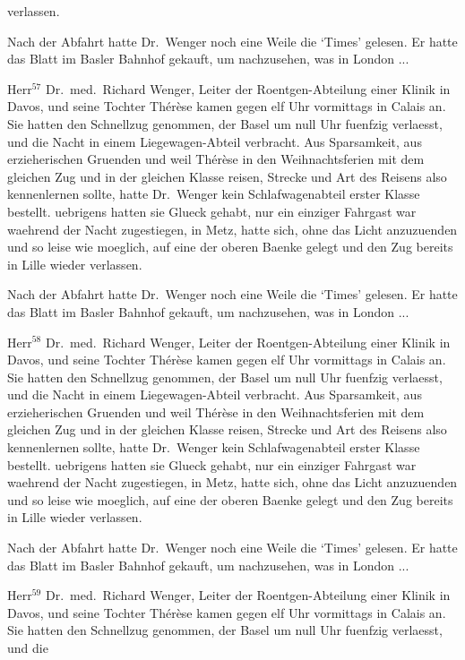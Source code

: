 verlassen.\par
Nach der Abfahrt hatte Dr.~Wen\-ger noch eine
Weile die `Times' gelesen. Er hatte das Blatt im
Basler Bahnhof gekauft, um nachzusehen, was in London ...\par
Herr$^{57}$ Dr.~med.~Richard Wenger, Leiter der Roent\-gen-Ab\-tei\-lung
einer Klinik in Davos, und seine
Tochter Th\'e\-r\`ese kamen gegen elf Uhr vormittags
in Calais an. Sie hatten den Schnellzug genommen,
der Basel um null Uhr fuenfzig verlaesst, und die
Nacht in einem Liege\-wagen-Abteil verbracht.
Aus Sparsamkeit, aus erzieherischen
Gruenden und weil
Th\'e\-r\`ese in den Weihnachtsferien mit dem gleichen
Zug und in der gleichen Klasse reisen, Strecke und
Art des Reisens also kennenlernen sollte, hatte Dr.~Wenger
kein Schlafwagenabteil erster Klasse bestellt.
uebrigens hatten sie Glueck gehabt, nur ein
einziger Fahrgast war waehrend der Nacht zugestiegen,
in Metz, hatte sich, ohne das Licht anzuzuenden
und so leise wie moeglich, auf eine der oberen
Baenke gelegt und den Zug bereits in Lille wieder
verlassen.\par
Nach der Abfahrt hatte Dr.~Wen\-ger noch eine
Weile die `Times' gelesen. Er hatte das Blatt im
Basler Bahnhof gekauft, um nachzusehen, was in London ...\par
Herr$^{58}$ Dr.~med.~Richard Wenger, Leiter der Roent\-gen-Ab\-tei\-lung
einer Klinik in Davos, und seine
Tochter Th\'e\-r\`ese kamen gegen elf Uhr vormittags
in Calais an. Sie hatten den Schnellzug genommen,
der Basel um null Uhr fuenfzig verlaesst, und die
Nacht in einem Liege\-wagen-Abteil verbracht.
Aus Sparsamkeit, aus erzieherischen
Gruenden und weil
Th\'e\-r\`ese in den Weihnachtsferien mit dem gleichen
Zug und in der gleichen Klasse reisen, Strecke und
Art des Reisens also kennenlernen sollte, hatte Dr.~Wenger
kein Schlafwagenabteil erster Klasse bestellt.
uebrigens hatten sie Glueck gehabt, nur ein
einziger Fahrgast war waehrend der Nacht zugestiegen,
in Metz, hatte sich, ohne das Licht anzuzuenden
und so leise wie moeglich, auf eine der oberen
Baenke gelegt und den Zug bereits in Lille wieder
verlassen.\par
Nach der Abfahrt hatte Dr.~Wen\-ger noch eine
Weile die `Times' gelesen. Er hatte das Blatt im
Basler Bahnhof gekauft, um nachzusehen, was in London ...\par
Herr$^{59}$ Dr.~med.~Richard Wenger, Leiter der Roent\-gen-Ab\-tei\-lung
einer Klinik in Davos, und seine
Tochter Th\'e\-r\`ese kamen gegen elf Uhr vormittags
in Calais an. Sie hatten den Schnellzug genommen,
der Basel um null Uhr fuenfzig verlaesst, und die
